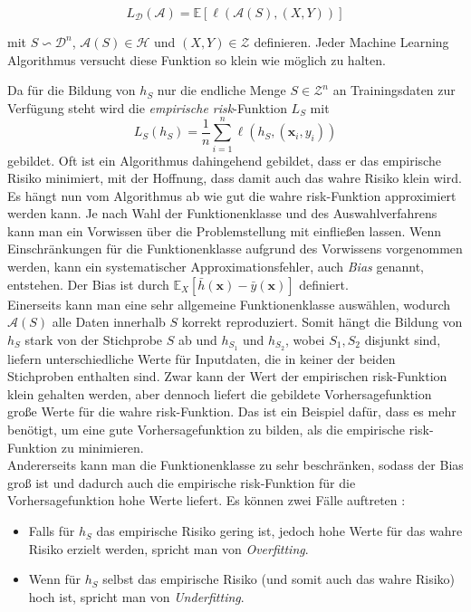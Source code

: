 $$ L_{\mathcal{D}}(\mathcal{A}) = \mathbb{E}[\ell(\mathcal{A}(S), (X,Y))]$$

mit $S \backsim \mathcal{D}^n$, $\mathcal{A}(S) \in \mathcal{H}$ und $(X,Y) \in \mathcal{Z}$ definieren. Jeder Machine Learning Algorithmus versucht diese Funktion so klein wie m\"oglich zu halten.


Da f\"ur die Bildung von $h_S$ nur die endliche Menge $S\in\mathcal{Z}^n$ an Trainingsdaten zur Verf\"ugung steht wird die 
\textit{empirische risk}-Funktion $L_S$ mit
$$ L_S(h_S) = \frac{1}{n}\sum_{i=1}^n \ell(h_S, (\mathbf{x}_i,y_i))$$
gebildet. Oft ist ein Algorithmus dahingehend gebildet, dass er das empirische Risiko minimiert, mit der Hoffnung, dass damit auch das wahre Risiko klein wird. \\


Es h\"angt nun vom Algorithmus ab wie gut die wahre risk-Funktion approximiert werden kann. Je nach Wahl der Funktionenklasse und des 
Auswahlverfahrens kann man ein Vorwissen \"uber die Problemstellung mit einflie{\ss}en lassen. Wenn Einschr\"ankungen f\"ur die 
Funktionenklasse aufgrund des Vorwissens vorgenommen werden, kann ein systematischer Approximationsfehler, auch \textit{Bias} genannt, entstehen. 
Der Bias ist durch $\mathbb{E}_X[\bar{h}(\mathbf{x})-\bar{y}(\mathbf{x})]$ definiert. \\


Einerseits kann man eine sehr allgemeine Funktionenklasse ausw\"ahlen, wodurch $\mathcal{A}(S)$ alle Daten innerhalb $S$ korrekt reproduziert. Somit 
h\"angt die Bildung von $h_S$ stark von der Stichprobe $S$ ab und $h_{S_1}$ und $h_{S_2}$, wobei $S_1, S_2$ disjunkt sind, liefern unterschiedliche Werte f\"ur Inputdaten, 
die in keiner der beiden Stichproben enthalten sind. Zwar kann der Wert der empirischen risk-Funktion klein gehalten werden, aber dennoch liefert die gebildete 
Vorhersagefunktion gro{\ss}e Werte f\"ur die wahre risk-Funktion. Das ist ein Beispiel daf\"ur, dass es mehr ben\"otigt, um eine gute Vorhersagefunktion zu bilden, als 
die empirische risk-Funktion zu minimieren. \\ 


Andererseits kann man die Funktionenklasse zu sehr beschr\"anken, sodass der Bias gro{\ss} ist und dadurch auch die empirische risk-Funktion f\"ur die 
Vorhersagefunktion hohe Werte liefert. Es k\"onnen zwei F\"alle auftreten \cite{strang}: 
\begin{itemize}
  \item Falls f\"ur $h_S$ das empirische Risiko gering ist, jedoch hohe Werte f\"ur das wahre Risiko erzielt werden, spricht man von \textit{Overfitting}.
  \item Wenn f\"ur $h_S$ selbst das empirische Risiko (und somit auch das wahre Risiko) hoch ist, spricht man von \textit{Underfitting}.
\end{itemize} 

